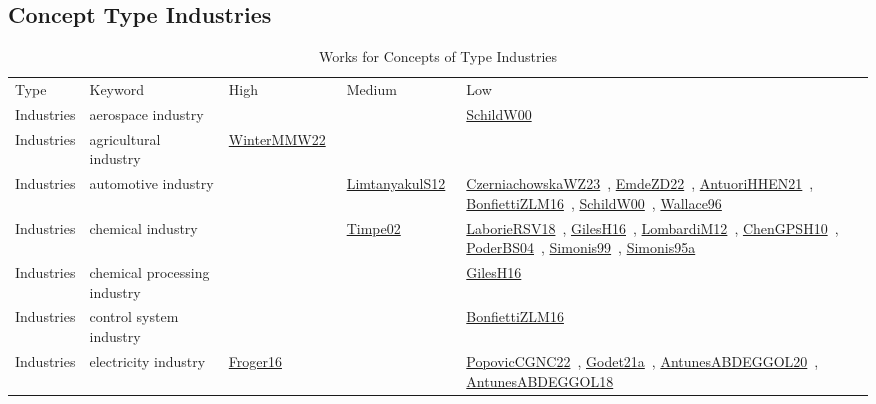 \clearpage
\subsection{Concept Type Industries}
\label{sec:Industries}
{\scriptsize
\begin{longtable}{lp{3cm}>{\raggedright\arraybackslash}p{6cm}>{\raggedright\arraybackslash}p{6cm}>{\raggedright\arraybackslash}p{8cm}}
\rowcolor{white}\caption{Works for Concepts of Type Industries}\\ \toprule
\rowcolor{white}Type & Keyword & High & Medium & Low\\ \midrule\endhead
\bottomrule
\endfoot
Industries & aerospace industry &  &  & \href{works/SchildW00.pdf}{SchildW00}~\cite{SchildW00}\\
Industries & agricultural industry & \href{works/WinterMMW22.pdf}{WinterMMW22}~\cite{WinterMMW22} &  & \\
Industries & automotive industry &  & \href{works/LimtanyakulS12.pdf}{LimtanyakulS12}~\cite{LimtanyakulS12} & \href{works/CzerniachowskaWZ23.pdf}{CzerniachowskaWZ23}~\cite{CzerniachowskaWZ23}, \href{works/EmdeZD22.pdf}{EmdeZD22}~\cite{EmdeZD22}, \href{works/AntuoriHHEN21.pdf}{AntuoriHHEN21}~\cite{AntuoriHHEN21}, \href{works/BonfiettiZLM16.pdf}{BonfiettiZLM16}~\cite{BonfiettiZLM16}, \href{works/SchildW00.pdf}{SchildW00}~\cite{SchildW00}, \href{works/Wallace96.pdf}{Wallace96}~\cite{Wallace96}\\
Industries & chemical industry &  & \href{works/Timpe02.pdf}{Timpe02}~\cite{Timpe02} & \href{works/LaborieRSV18.pdf}{LaborieRSV18}~\cite{LaborieRSV18}, \href{works/GilesH16.pdf}{GilesH16}~\cite{GilesH16}, \href{works/LombardiM12.pdf}{LombardiM12}~\cite{LombardiM12}, \href{works/ChenGPSH10.pdf}{ChenGPSH10}~\cite{ChenGPSH10}, \href{works/PoderBS04.pdf}{PoderBS04}~\cite{PoderBS04}, \href{works/Simonis99.pdf}{Simonis99}~\cite{Simonis99}, \href{works/Simonis95a.pdf}{Simonis95a}~\cite{Simonis95a}\\
Industries & chemical processing industry &  &  & \href{works/GilesH16.pdf}{GilesH16}~\cite{GilesH16}\\
Industries & control system industry &  &  & \href{works/BonfiettiZLM16.pdf}{BonfiettiZLM16}~\cite{BonfiettiZLM16}\\
Industries & electricity industry & \href{works/Froger16.pdf}{Froger16}~\cite{Froger16} &  & \href{works/PopovicCGNC22.pdf}{PopovicCGNC22}~\cite{PopovicCGNC22}, \href{works/Godet21a.pdf}{Godet21a}~\cite{Godet21a}, \href{works/AntunesABDEGGOL20.pdf}{AntunesABDEGGOL20}~\cite{AntunesABDEGGOL20}, \href{works/AntunesABDEGGOL18.pdf}{AntunesABDEGGOL18}~\cite{AntunesABDEGGOL18}\\

\end{longtable}}
